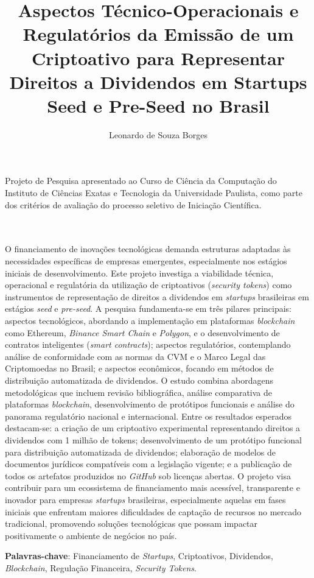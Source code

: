 \documentclass[12pt, a4paper, oneside, openright, chapter=TITLE]{abntex2}
\title{
    Aspectos Técnico-Operacionais e Regulatórios da Emissão de um Criptoativo para Representar Direitos a Dividendos em Startups Seed e Pre-Seed no Brasil \\
    \vspace{0.5cm}
}
\author{Leonardo de Souza Borges}
\renewcommand{\imprimirfolhaderosto}{%
    \begin{titlepage}
        \begin{center}
            {\ABNTEXchapterfont\large\imprimirinstituicao\par}
            \vspace{4cm}

            {\ABNTEXchapterfont\bfseries\Large\imprimirtitulo\par}
            \vspace{3cm}
        \end{center}

        \begin{flushright}
            \begin{minipage}{0.5\textwidth}
                \small
                Projeto de Pesquisa apresentado ao Curso de Ciência da Computação do Instituto de Ciências Exatas e Tecnologia da Universidade Paulista, como parte dos critérios de avaliação do processo seletivo de Iniciação Científica.
                \\
                \imprimirorientadorRotulo
                \\
                ~\imprimirorientador
            \end{minipage}
        \end{flushright}

        \vspace{2cm}

        \begin{center}
            {\ABNTEXchapterfont\large\imprimirautor\par}
            \vspace{2cm}

            {\ABNTEXchapterfont\large\imprimirlocal\par}
            {\ABNTEXchapterfont\large\imprimirdata\par}
        \end{center}
    \end{titlepage}
}
\begin{document}
\setcounter{page}{1}

\imprimirfolhaderosto
%

\clearpage
\begin{resumo}
\vspace{1cm}
O financiamento de inovações tecnológicas demanda estruturas adaptadas às necessidades específicas de empresas emergentes, especialmente nos estágios iniciais de desenvolvimento. Este projeto investiga a viabilidade técnica, operacional e regulatória da utilização de criptoativos (\textit{security tokens}) como instrumentos de representação de direitos a dividendos em \textit{startups} brasileiras em estágios \textit{seed} e \textit{pre-seed}. A pesquisa fundamenta-se em três pilares principais: aspectos tecnológicos, abordando a implementação em plataformas \textit{blockchain} como Ethereum, \textit{Binance Smart Chain} e \textit{Polygon}, e o desenvolvimento de contratos inteligentes (\textit{smart contracts}); aspectos regulatórios, contemplando análise de conformidade com as normas da CVM e o Marco Legal das Criptomoedas no Brasil; e aspectos econômicos, focando em métodos de distribuição automatizada de dividendos. O estudo combina abordagens metodológicas que incluem revisão bibliográfica, análise comparativa de plataformas \textit{blockchain}, desenvolvimento de protótipos funcionais e análise do panorama regulatório nacional e internacional. Entre os resultados esperados destacam-se: a criação de um criptoativo experimental representando direitos a dividendos com 1 milhão de tokens; desenvolvimento de um protótipo funcional para distribuição automatizada de dividendos; elaboração de modelos de documentos jurídicos compatíveis com a legislação vigente; e a publicação de todos os artefatos produzidos no \textit{GitHub} sob licenças abertas. O projeto visa contribuir para um ecossistema de financiamento mais acessível, transparente e inovador para empresas \textit{startups} brasileiras, especialmente aquelas em fases iniciais que enfrentam maiores dificuldades de captação de recursos no mercado tradicional, promovendo soluções tecnológicas que possam impactar positivamente o ambiente de negócios no país.


\textbf{Palavras-chave}: Financiamento de \textit{Startups}, Criptoativos, Dividendos, \textit{Blockchain}, Regulação Financeira, \textit{Security Tokens}.
\end{resumo}

\clearpage
{}
\begin{samepage}
\begingroup
\setlength{\parskip}{0pt}
\tableofcontents*
\endgroup
\end{samepage}
\clearpage
\end{document}
